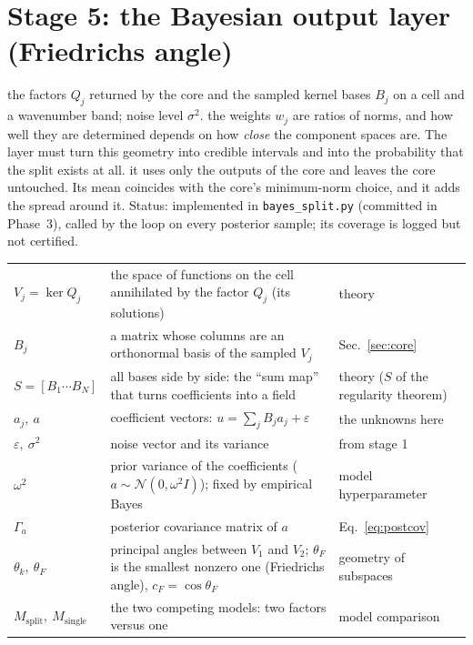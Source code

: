 \section{Stage 5: the Bayesian output layer (Friedrichs angle)}\label{sec:bayes}
\sectionbrief
{the factors $Q_j$ returned by the core and the sampled kernel bases $B_j$ on a cell and a wavenumber band; noise level $\sigma^2$.}
{the weights $w_j$ are ratios of norms, and how well they are determined depends on how \emph{close} the component spaces are. The layer must turn this geometry into credible intervals and into the probability that the split exists at all.}
{it uses only the outputs of the core and leaves the core untouched. Its mean coincides with the core's minimum-norm choice, and it adds the spread around it. Status: implemented in \texttt{bayes\_split.py} (committed in Phase~3), called by the loop on every posterior sample; its coverage is logged but not certified.}

\begin{symbols}
\begin{tabular}{@{}L{2.6cm}L{6.0cm}L{4.3cm}@{}}
$V_j=\ker Q_j$ & the space of functions on the cell annihilated by the factor $Q_j$ (its solutions) & theory\\
$B_j$ & a matrix whose columns are an orthonormal basis of the sampled $V_j$ & Sec.~\ref{sec:core}\\
$S=[B_1\cdots B_N]$ & all bases side by side: the ``sum map'' that turns coefficients into a field & theory ($S$ of the regularity theorem)\\
$a_j,\ a$ & coefficient vectors: $u=\sum_jB_ja_j+\varepsilon$ & the unknowns here\\
$\varepsilon,\ \sigma^2$ & noise vector and its variance & from stage 1\\
$\omega^2$ & prior variance of the coefficients ($a\sim\mathcal N(0,\omega^2I)$); fixed by empirical Bayes & model hyperparameter\\
$\Gamma_a$ & posterior covariance matrix of $a$ & Eq.~\eqref{eq:postcov}\\
$\theta_k,\ \theta_F$ & principal angles between $V_1$ and $V_2$; $\theta_F$ is the smallest nonzero one (Friedrichs angle), $c_F=\cos\theta_F$ & geometry of subspaces\\
$M_{\mathrm{split}},\ M_{\mathrm{single}}$ & the two competing models: two factors versus one & model comparison\\
\end{tabular}
\end{symbols}

